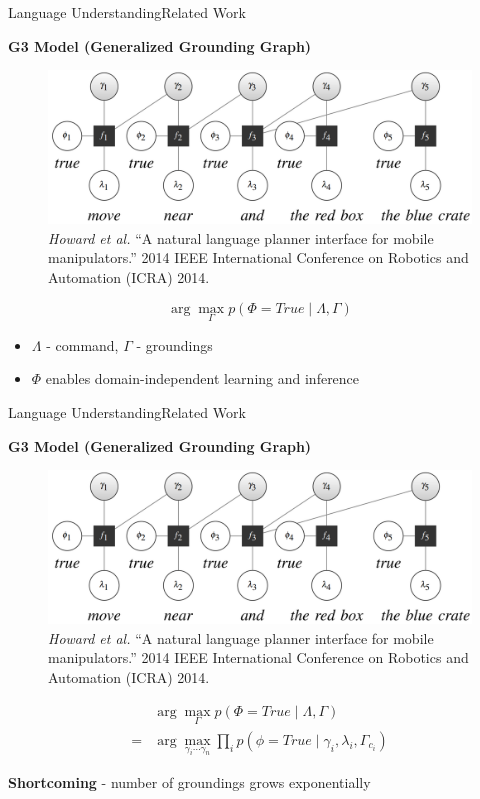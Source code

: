 \begin{frame}{Language Understanding}{Related Work}

{\bf G3 Model (Generalized Grounding Graph)\footnotemark }

\begin{figure}
	\centering
	\includegraphics[width=.6\linewidth]{figure/G3}
	\caption{ \tiny{ {\it Howard et al.} ``A natural language planner interface for mobile manipulators.'' 2014 IEEE International Conference on Robotics and Automation (ICRA) 2014. } }
\end{figure}
\begin{equation}
\nonumber
\arg \max_{\Gamma} p( \Phi = True \mid \Lambda , \Gamma ) 
\end{equation}
\begin{itemize}
\item $ \Lambda $ - command, $ \Gamma $ - groundings
\item $ \Phi $ enables domain-independent learning and inference
\end{itemize}


\end{frame}

\begin{frame}{Language Understanding}{Related Work}
	
	{\bf G3 Model (Generalized Grounding Graph) }
	
	\begin{figure}
		\centering
		\includegraphics[width=.6\linewidth]{figure/G3}
		\caption{ \tiny{ {\it Howard et al.} ``A natural language planner interface for mobile manipulators.'' 2014 IEEE International Conference on Robotics and Automation (ICRA) 2014. } }
	\end{figure}
	
	\begin{equation}
	\nonumber
	\begin{aligned}
	& \arg \max_{\Gamma} p( \Phi = True \mid \Lambda , \Gamma )  \\
	= & \arg \max_{\gamma_i \cdots \gamma_n} \prod_i p( \phi = True \mid \gamma_i , \lambda_i , \Gamma_{c_i} )
	\end{aligned}
	\end{equation}
	
	{\bf Shortcoming} - number of groundings grows exponentially
	
	
\end{frame}

